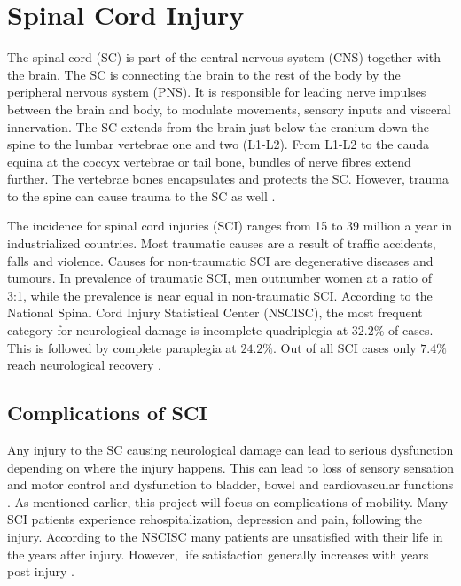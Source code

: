
\section{Spinal Cord Injury}

The spinal cord (SC) is part of the central nervous system (CNS) together with the brain. The SC is connecting the brain to the rest of the body by the peripheral nervous system (PNS). It is responsible for leading nerve impulses between the brain and body, to modulate movements, sensory inputs and visceral innervation. The SC extends from the brain just below the cranium down the spine to the lumbar vertebrae one and two (L1-L2). From L1-L2 to the cauda equina at the coccyx vertebrae or tail bone, bundles of nerve fibres extend further. The vertebrae bones encapsulates and protects the SC. However, trauma to the spine can cause trauma to the SC as well \cite{Weidner2017}.

The incidence for spinal cord injuries (SCI) ranges from 15 to 39 million a year in industrialized countries. Most traumatic causes are a result of traffic accidents, falls and violence. Causes for non-traumatic SCI are degenerative diseases and tumours. In prevalence of traumatic SCI, men outnumber women at a ratio of 3:1, while the prevalence is near equal in non-traumatic SCI. According to the National Spinal Cord Injury Statistical Center (NSCISC), the most frequent category for neurological damage is incomplete quadriplegia at $32.2\%$ of cases. This is followed by complete paraplegia at $24.2\%$. Out of all SCI cases only $7.4\%$ reach neurological recovery \cite{NSCISC2017}. %

\subsection{Complications of SCI}
Any injury to the SC causing neurological damage can lead to serious dysfunction depending on where the injury happens. This can lead to loss of sensory sensation and motor control and dysfunction to bladder, bowel and cardiovascular functions \cite{Weidner2017, Zehr2011}. As mentioned earlier, this project will focus on complications of mobility.
Many SCI patients experience rehospitalization, depression and pain, following the injury. According to the NSCISC many patients are unsatisfied with their life in the years after injury. However, life satisfaction generally increases with years post injury \cite{NSCISC2017}.